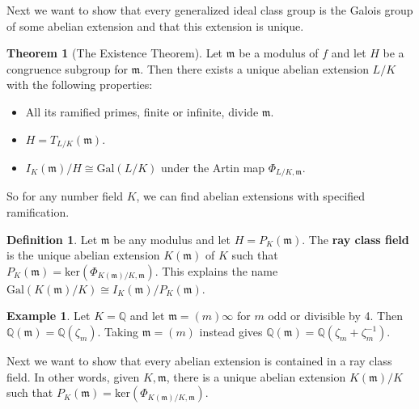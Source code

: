 \documentclass{article}
\theoremstyle{definition}
\newtheorem{theorem}{Theorem}[section]
\newtheorem{example}{Example}[section]
\newtheorem{defn}{Definition}[section]
\begin{document}
Next we want to show that every generalized ideal class group is the Galois group of some abelian extension and that this extension is unique.
\begin{theorem}[The Existence Theorem]
    Let $\mathfrak{m}$ be a modulus of $f$ and let $H$ be a congruence subgroup for $\mathfrak{m}$. Then there exists a unique abelian extension $L/K$ with the following properties:
    \begin{itemize}
        \item All its ramified primes, finite or infinite, divide $\mathfrak{m}$.
        \item $H = T_{L/K}(\mathfrak{m})$.
        \item $I_K(\mathfrak{m})/H \cong \text{Gal}(L/K)$ under the Artin map $\Phi_{L/K,\mathfrak{m}}$.
    \end{itemize}
\end{theorem}
So for any number field $K$, we can find abelian extensions with specified ramification.
\begin{defn}
    Let $\mathfrak{m}$ be any modulus and let $H = P_K(\mathfrak{m})$. The \textbf{ray class field} is the unique abelian extension $K(\mathfrak{m})$ of $K$ such that $P_K(\mathfrak{m}) = \text{ker}(\Phi_{K(\mathfrak{m})/K, \mathfrak{m}})$. This explains the name $\text{Gal}(K(\mathfrak{m})/K) \cong I_K(\mathfrak{m})/P_K(\mathfrak{m})$.
\end{defn}
\begin{example}
    Let $K=\mathbb{Q}$ and let $\mathfrak{m} = (m)\infty$ for $m$ odd or divisible by 4. Then $\mathbb{Q}(\mathfrak{m}) = \mathbb{Q}(\zeta_m)$. Taking $\mathfrak{m} = (m)$ instead gives $\mathbb{Q}(\mathfrak{m}) = \mathbb{Q}(\zeta_m + \zeta_m^{-1})$.
\end{example}
Next we want to show that every abelian extension is contained in a ray class field.
In other words, given $K, \mathfrak{m}$, there is a unique abelian extension $K(\mathfrak{m})/K$ such that $P_K(\mathfrak{m}) = \text{ker}(\Phi_{K(\mathfrak{m})/K,\mathfrak{m}})$.
\end{document}
